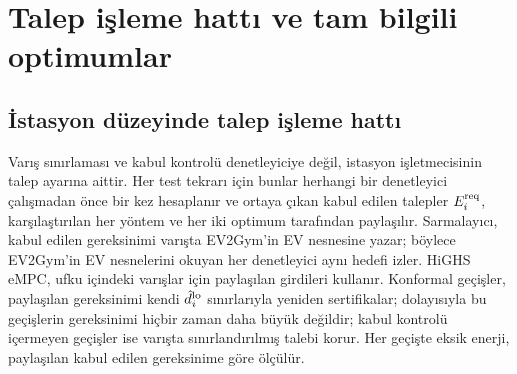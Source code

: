 \section{Talep işleme hattı ve tam bilgili optimumlar}\label{sec:pipeline}

\subsection{İstasyon düzeyinde talep işleme hattı}\label{app:admission}

Varış sınırlaması ve kabul kontrolü denetleyiciye değil, istasyon işletmecisinin talep ayarına aittir.
Her test tekrarı için bunlar herhangi bir denetleyici çalışmadan önce bir kez hesaplanır ve ortaya çıkan kabul edilen talepler $E^{\mathrm{req}}_i$, karşılaştırılan her yöntem ve her iki optimum tarafından paylaşılır.
Sarmalayıcı, kabul edilen gereksinimi varışta EV2Gym'in EV nesnesine yazar; böylece EV2Gym'in EV nesnelerini okuyan her denetleyici aynı hedefi izler.
HiGHS eMPC, ufku içindeki varışlar için paylaşılan girdileri kullanır.
Konformal geçişler, paylaşılan gereksinimi kendi $\hat d_i^{\mathrm{lo}}$ sınırlarıyla yeniden sertifikalar; dolayısıyla bu geçişlerin gereksinimi hiçbir zaman daha büyük değildir; kabul kontrolü içermeyen geçişler ise varışta sınırlandırılmış talebi korur.
Her geçişte eksik enerji, paylaşılan kabul edilen gereksinime göre ölçülür.

